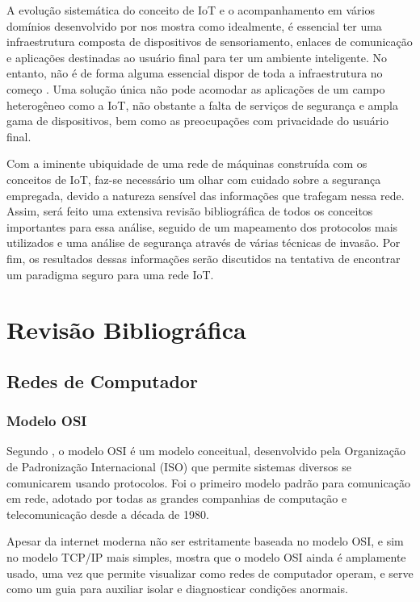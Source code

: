 \documentclass[tcc,capa]{texufpel}
\begin{document}
A evolução sistemática do conceito de IoT e o acompanhamento em vários domínios desenvolvido por \citet{Ibarra-Esquer} nos mostra como idealmente, é essencial ter uma infraestrutura composta de dispositivos de sensoriamento, enlaces de comunicação e aplicações destinadas ao usuário final para ter um ambiente inteligente. No entanto, não é de forma alguma essencial dispor de toda a infraestrutura no começo \cite{laya}. Uma solução única não pode acomodar as aplicações de um campo heterogêneo como a IoT, não obstante a falta de serviços de segurança e ampla gama de dispositivos, bem como as preocupações com privacidade do usuário final. 

Com a iminente ubiquidade de uma rede de máquinas construída com os conceitos de IoT, faz-se necessário um olhar com cuidado sobre a segurança empregada, devido a natureza sensível das informações que trafegam nessa rede. Assim, será feito uma extensiva revisão bibliográfica de todos os conceitos importantes para essa análise, seguido de um mapeamento dos protocolos mais utilizados e uma análise de segurança através de várias técnicas de invasão. Por fim, os resultados dessas informações serão discutidos na tentativa de encontrar um paradigma seguro para uma rede IoT.

\chapter{Revisão Bibliográfica}

\section{Redes de Computador}
\subsection{Modelo OSI}

Segundo \citet{kurose}, o modelo OSI é um modelo conceitual, desenvolvido pela Organização de Padronização Internacional (ISO) que permite sistemas diversos se comunicarem usando protocolos. Foi o primeiro modelo padrão para comunicação em rede, adotado por todas as grandes companhias de computação e telecomunicação desde a década de 1980.

Apesar da internet moderna não ser estritamente baseada no modelo OSI, e sim no modelo TCP/IP mais simples, \citet{kurose} mostra que o modelo OSI ainda é amplamente usado, uma vez que permite visualizar como redes de computador operam, e serve como um guia para auxiliar isolar e 
diagnosticar condições anormais.
\end{document}
